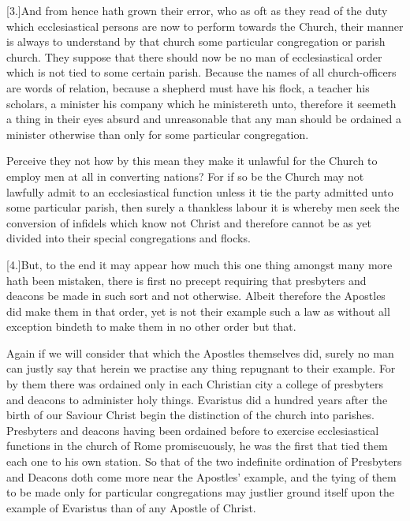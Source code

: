 [3.]And from hence hath grown their error, who as oft as they read of the duty which ecclesiastical persons are now  to perform towards the Church,
 their manner is always to understand by that church some particular congregation or parish church. They suppose that there should now be no man of ecclesiastical order which is not tied to some certain parish. Because the names of all church-officers are words of relation, because a shepherd must have his flock, a teacher his scholars, a minister his company which he ministereth unto, therefore it seemeth a thing in their eyes absurd and unreasonable that any man should be ordained a minister otherwise than only for some particular congregation.

Perceive they not how by this mean they make it unlawful for the Church to employ men at all in converting nations? For if so be the Church may not lawfully admit to an ecclesiastical function unless it tie the party admitted unto some particular parish, then surely a thankless labour it is whereby men seek the conversion of infidels which know not Christ and therefore cannot be as yet divided into their special congregations and flocks.

[4.]But, to the end it may appear how much this one thing amongst many more hath been mistaken, there is first no precept requiring that presbyters and deacons be made in such sort and not otherwise. Albeit therefore the Apostles did make them in that order, yet is not their example such a law as without all exception bindeth to make them in no other order but that.

Again if we will consider that which the Apostles themselves did, surely no man can justly say that herein we practise any thing repugnant to their example. For by them  there was ordained only in each Christian city a college of presbyters and deacons to administer holy things.
 Evaristus did a hundred years after the birth of our Saviour Christ begin the distinction of the church into parishes. Presbyters and deacons having been ordained before to exercise ecclesiastical functions in the church of Rome promiscuously, he was the first that tied them each one to his own station. So that of the two indefinite ordination of Presbyters and Deacons doth come more near the Apostles’ example, and the tying of them to be made only for particular congregations may justlier ground itself upon the example of Evaristus than of any Apostle of Christ.

